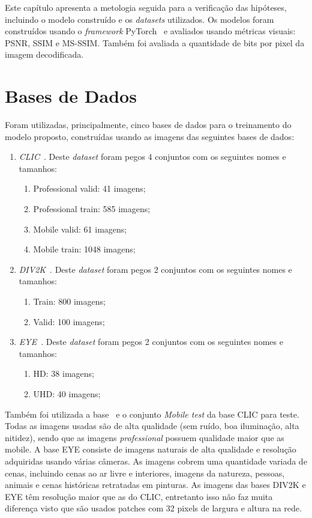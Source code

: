 Este capítulo apresenta a metologia seguida para a verificação das hipóteses, incluindo o modelo construído e os \textit{datasets} utilizados. Os modelos foram construídos usando o \textit{framework} PyTorch~\cite{pytorch} e avaliados usando métricas visuais: \acrshort{PSNR}, \acrshort{SSIM} e \acrshort{MS-SSIM}. Também foi avaliada a quantidade de bits por pixel da imagem decodificada.

\section{Bases de Dados}%
Foram utilizadas, principalmente, cinco bases de dados para o treinamento do modelo proposto, construídas usando as imagens das seguintes bases de dados:
\begin{enumerate}
    \item \emph{\acrshort{CLIC}}~\cite{clic}. Deste \textit{dataset} foram pegos 4 conjuntos com os seguintes nomes e tamanhos:
    \begin{enumerate}
        \item Professional valid: 41 imagens;
        \item Professional train: 585 imagens;
        \item Mobile valid: 61 imagens;
        \item Mobile train: 1048 imagens;
    \end{enumerate}
    \item \emph{\acrshort{DIV2K}}~\cite{div2k}. Deste \textit{dataset} foram pegos 2 conjuntos com os seguintes nomes e tamanhos:
    \begin{enumerate}
        \item Train: 800 imagens;
        \item Valid: 100 imagens;
    \end{enumerate}
    \item \emph{\acrshort{EYE}}~\cite{ultra_eye}. Deste \textit{dataset} foram pegos 2 conjuntos com os seguintes nomes e tamanhos:
    \begin{enumerate}
        \item HD: 38 imagens;
        \item UHD: 40 imagens;
    \end{enumerate}
\end{enumerate}
Também foi utilizada a base~\cite{kodak} e o conjunto \textit{Mobile test} da base \acrshort{CLIC} para teste. Todas as imagens usadas são de alta qualidade (sem ruído, boa iluminação, alta nitidez), sendo que as imagens \textit{professional} possuem qualidade maior que as {mobile}. A base \acrshort{EYE} consiste de imagens naturais de alta qualidade e resolução adquiridas usando várias câmeras. As imagens cobrem uma quantidade variada de cenas, incluindo cenas ao ar livre e interiores, imagens da natureza, pessoas, animais e cenas históricas retratadas em pinturas. As imagens das bases \acrshort{DIV2K} e \acrshort{EYE} têm resolução maior que as do \acrshort{CLIC}, entretanto isso não faz muita diferença visto que são usados patches com 32 pixels de largura e altura na rede.

